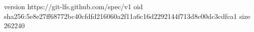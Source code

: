 version https://git-lfs.github.com/spec/v1
oid sha256:5e8e27ff68772bc40cfdfd216060a2f11a6c16d2292144f713d8c00dc3cdfca1
size 262240
